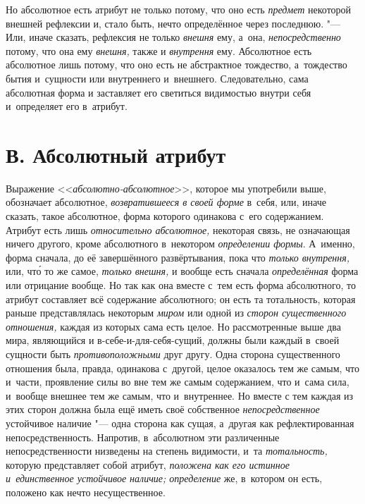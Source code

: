 Но абсолютное есть атрибут не только потому, что оно есть
{\em предмет} некоторой внешней рефлексии и, стало
быть, нечто определённое через последнюю. "--- Или, иначе сказать, рефлексия
не только {\em внешня} ему, а~она,
{\em непосредственно} потому, что она ему
{\em внешня,} также и
{\em внутрення} ему. Абсолютное есть абсолютное лишь
потому, что оно есть не абстрактное тождество, а~тождество бытия и~сущности
или внутреннего и~внешнего. Следовательно, сама абсолютная форма и
заставляет его светиться видимостью внутри себя и~определяет его в~атрибут.


\section[В. Абсолютный атрибут]{В. Абсолютный атрибут}

Выражение <<{\em абсолютно-абсолютное}>>, которое мы употребили
выше, обозначает абсолютное, {\em возвратившееся в
своей форме} в~себя, или, иначе сказать, такое абсолютное, форма которого
одинакова с~его содержанием. Атрибут есть лишь
{\em относительно абсолютное,} некоторая связь, не
означающая ничего другого, кроме абсолютного в~некотором
{\em определении формы}. А~именно, форма сначала, до её
завершённого развёртывания, пока что {\em только
внутрення,} или, чт\'{о} то же самое, {\em только внешня,}
и вообще есть сначала {\em определённая} форма или
отрицание вообще. Но так как она вместе с~тем есть форма абсолютного, то
атрибут составляет всё содержание абсолютного; он есть та тотальность,
которая раньше представлялась некоторым {\em миром} или
одной из {\em сторон существенного отношения,} каждая
из которых сама есть целое. Но рассмотренные выше два мира, являющийся и
в-себе-и-для-себя-сущий, должны были каждый в~своей сущности быть
{\em противоположными} друг другу. Одна сторона
существенного отношения была, правда, одинакова с~другой, целое оказалось
тем же самым, что и~части, проявление силы во вне тем же самым содержанием,
что и~сама сила, и~вообще внешнее тем же самым, что и~внутреннее. Но вместе
с тем каждая из этих сторон должна была ещё иметь своё собственное
{\em непосредственное} устойчивое наличие "--- одна
сторона как сущая, а~другая как рефлектированная непосредственность.
Напротив, в~абсолютном эти различенные непосредственности низведены на
степень видимости, и~та {\em тотальность,} которую
представляет собой атрибут, {\em положена как его
истинное и~единственное устойчивое наличие; определение} же, в~котором он
есть, положено как нечто несущественное.

